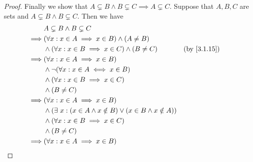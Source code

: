 \begin{proof}
  Finally we show that \(A \subsetneq B \land B \subsetneq C \implies A \subsetneq C\).
  Suppose that \(A, B, C\) are sets and \(A \subsetneq B \land B \subsetneq C\).
  Then we have
  \begin{align*}
             & A \subsetneq B \land B \subsetneq C                                                                                                          \\
    \implies & (\forall x : x \in A \implies x \in B) \land (A \neq B)                                                                                      \\
             & \land (\forall x : x \in B \implies x \in C) \land (B \neq C)                   &  & \text{(by \cref{3.1.15})}                               \\
    \implies & (\forall x : x \in A \implies x \in B)                                                                                                       \\
             & \land \lnot(\forall x : x \in A \iff x \in B)                                                                                                \\
             & \land (\forall x : x \in B \implies x \in C)                                                                                                 \\
             & \land (B \neq C)                                                                                                                             \\
    \implies & (\forall x : x \in A \implies x \in B)                                                                                                       \\
             & \land (\exists\ x : (x \in A \land x \notin B) \lor (x \in B \land x \notin A))                                                              \\
             & \land (\forall x : x \in B \implies x \in C)                                                                                                 \\
             & \land (B \neq C)                                                                                                                             \\
    \implies & (\forall x : x \in A \implies x \in B)                                                                                                       \\

\end{align*}
\end{proof}
